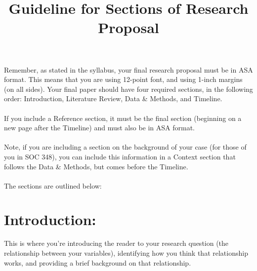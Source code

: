 \documentclass{article}
\begin{document}
\title{Guideline for Sections of Research Proposal}
\author[*]{}
\date{}
\maketitle

Remember, as stated in the syllabus, your final research proposal must be in ASA format. This means that you are using 12-point font, and using 1-inch margins (on all sides). Your final paper should have four required sections, in the following order: Introduction, Literature Review, Data \& Methods, and Timeline. 
\\ \\ 
If you include a Reference section, it must be the final section (beginning on a new page after the Timeline) and must also be in ASA format. 
\\ \\
Note, if you are including a section on the background of your case (for those of you in SOC 348), you can include this information in a Context section that follows the Data \& Methods, but comes before the Timeline.
\\ \\
The sections are outlined below:



\section*{Introduction:}
This is where you're introducing the reader to your research question (the relationship between your variables), identifying how you think that relationship works, and providing a brief background on that relationship.
\end{document}
